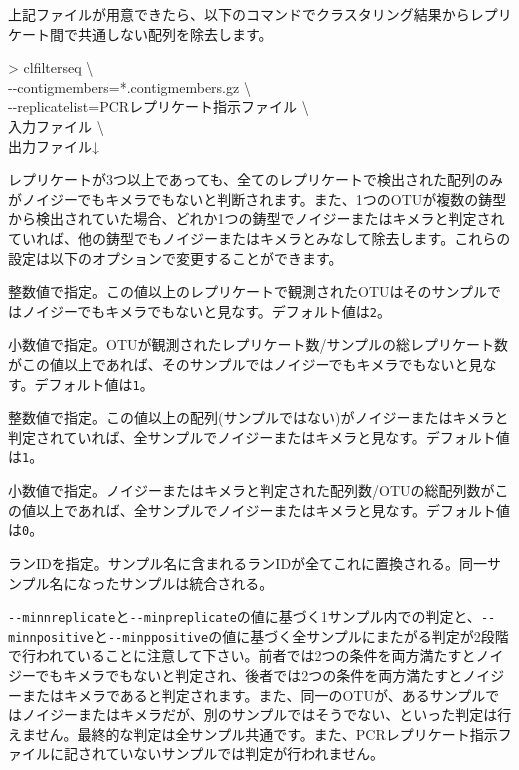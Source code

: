 \documentclass[titlepage,10pt,a4paper]{jsbook}
\newenvironment{cmd}{\begin{oframed}\raggedright\ttfamily\footnotesize\setlength{\baselineskip}{1.4em}}{\end{oframed}\vspace{-1em}}
\begin{document}
上記ファイルが用意できたら、以下のコマンドでクラスタリング結果からレプリケート間で共通しない配列を除去します。
\begin{cmd}
{\textgreater} clfilterseq {\textbackslash}\\
{-}{-}contigmembers=*.contigmembers.gz {\textbackslash}\\
{-}{-}replicatelist=PCRレプリケート指示ファイル {\textbackslash}\\
入力ファイル {\textbackslash}\\
出力ファイル↓
\end{cmd}
レプリケートが3つ以上であっても、全てのレプリケートで検出された配列のみがノイジーでもキメラでもないと判断されます。また、1つのOTUが複数の鋳型から検出されていた場合、どれか1つの鋳型でノイジーまたはキメラと判定されていれば、他の鋳型でもノイジーまたはキメラとみなして除去します。これらの設定は以下のオプションで変更することができます。
\begin{description}\small\setlength{\baselineskip}{1.1em}
\item[\texttt{{-}{-}minnreplicate}] 整数値で指定。この値以上のレプリケートで観測されたOTUはそのサンプルではノイジーでもキメラでもないと見なす。デフォルト値は\texttt{2}。
\item[\texttt{{-}{-}minpreplicate}] 小数値で指定。OTUが観測されたレプリケート数/サンプルの総レプリケート数がこの値以上であれば、そのサンプルではノイジーでもキメラでもないと見なす。デフォルト値は\texttt{1}。
\item[\texttt{{-}{-}minnpositive}] 整数値で指定。この値以上の配列(サンプルではない)がノイジーまたはキメラと判定されていれば、全サンプルでノイジーまたはキメラと見なす。デフォルト値は\texttt{1}。
\item[\texttt{{-}{-}minppositive}] 小数値で指定。ノイジーまたはキメラと判定された配列数/OTUの総配列数がこの値以上であれば、全サンプルでノイジーまたはキメラと見なす。デフォルト値は\texttt{0}。
\item[\texttt{{-}{-}runname}] ランIDを指定。サンプル名に含まれるランIDが全てこれに置換される。同一サンプル名になったサンプルは統合される。
\end{description}
\texttt{{-}{-}minnreplicate}と\texttt{{-}{-}minpreplicate}の値に基づく1サンプル内での判定と、\texttt{{-}{-}minnpositive}と\texttt{{-}{-}minppositive}の値に基づく全サンプルにまたがる判定が2段階で行われていることに注意して下さい。前者では2つの条件を両方満たすとノイジーでもキメラでもないと判定され、後者では2つの条件を両方満たすとノイジーまたはキメラであると判定されます。また、同一のOTUが、あるサンプルではノイジーまたはキメラだが、別のサンプルではそうでない、といった判定は行えません。最終的な判定は全サンプル共通です。また、PCRレプリケート指示ファイルに記されていないサンプルでは判定が行われません。
\end{document}
